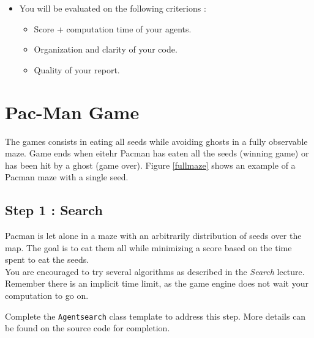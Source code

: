 \documentclass[12pt,a4paper,BCOR12mm, headexclude, footexclude, twoside, openright]{scrartcl}
\numberwithin{equation}{section} %
\numberwithin{figure}{section} %
\numberwithin{table}{section} %
\begin{document}
\begin{itemize}
	\item You will be evaluated on the following criterions : 
    \begin{itemize}
		\item Score + computation time of your agents.
        \item Organization and clarity of your code.
        \item Quality of your report.
	\end{itemize}
\end{itemize}

\section{Pac-Man Game}

The games consists in eating all seeds while avoiding ghosts in a fully observable maze. Game ends when eitehr Pacman has eaten all the seeds (winning game) or has been hit by a ghost (game over). Figure \ref{fullmaze} shows an example of a Pacman maze with a single seed. 

\subsection{Step 1 : Search}

Pacman is let alone in a maze with an arbitrarily distribution of seeds over the map. The goal is to eat them all while minimizing a score based on the time spent to eat the seeds.\\

You are encouraged to try several algorithms as described in the \emph{Search} lecture. Remember there is an implicit time limit, as the game engine does not wait your computation to go on.

Complete the \texttt{Agentsearch} class template to address this step. More details can be found on the source code for completion.
\end{document}
